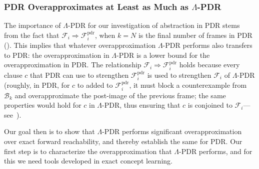 \documentclass[acmsmall,screen]{acmart}
\renewcommand{\implies}{\Longrightarrow}
\newcommand{\Frame}{\mathcal{F}}
\newcommand{\Framepdr}{\mathcal{F}^{\text{pdr}}}
\newcommand{\bkwrch}[1]{\mathcal{B}_{#1}}
\begin{document}
\begin{changebar}
\subsubsection{PDR Overapproximates at Least as Much as $\Lambda$-PDR}
The importance of $\Lambda$-PDR for our investigation of abstraction in PDR stems from the fact that $\Frame_i \implies \Framepdr_i$, when $k=N$ is the final number of frames in PDR ().
This implies that whatever overapproximation $\Lambda$-PDR performs also transfers to PDR: the overapproximation in $\Lambda$-PDR is a lower bound for the overapproximation in PDR.
%
The relationship $\Frame_i \implies \Framepdr_i$ holds because every clause $c$ that PDR can use to strengthen $\Framepdr_i$ is used to strengthen $\Frame_i$ of $\Lambda$-PDR (roughly, in PDR, for $c$ to added to $\Framepdr_i$, it must block a counterexample from $\bkwrch{k}$ and overapproximate the post-image of the previous frame; the same properties would hold for $c$ in $\Lambda$-PDR, thus ensuring that $c$ is conjoined to $\Frame_i$---see~).

Our goal then is to show that $\Lambda$-PDR performs significant overapproximation over exact forward reachability, and thereby establish the same for PDR.
Our first step is to characterize the overapproximation that $\Lambda$-PDR performs, and for this we need tools developed in exact concept learning.
\end{changebar}
\end{document}
